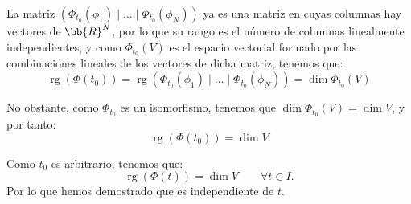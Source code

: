 \documentclass[12pt]{article}
\begin{document}
\begin{ejercicio}
        La matriz $\left(\Phi_{t_0}(\phi_1)\mid \dots\mid \Phi_{t_0}(\phi_N)\right)$ ya es una matriz en cuyas columnas hay vectores de $\bb{R}^N$, por lo que su rango es el número de columnas linealmente independientes, y como $\Phi_{t_0}(V)$ es el espacio vectorial formado por las combinaciones lineales de los vectores de dicha matriz, tenemos que:
        \begin{equation*}
            \operatorname{rg}(\Phi(t_0))=\operatorname{rg}(\Phi_{t_0}(\phi_1)\mid \dots\mid \Phi_{t_0}(\phi_N))
            = \dim \Phi_{t_0}(V)
        \end{equation*}

        No obstante, como $\Phi_{t_0}$ es un isomorfismo, tenemos que $\dim \Phi_{t_0}(V)=\dim V$, y por tanto:
        \begin{equation*}
            \operatorname{rg}(\Phi(t_0))=\dim V
        \end{equation*}

        Como $t_0$ es arbitrario, tenemos que:
        \begin{equation*}
            \operatorname{rg}(\Phi(t))=\dim V\qquad \forall t\in I.
        \end{equation*}
        Por lo que hemos demostrado que es independiente de $t$.
    \end{ejercicio}
\end{document}
